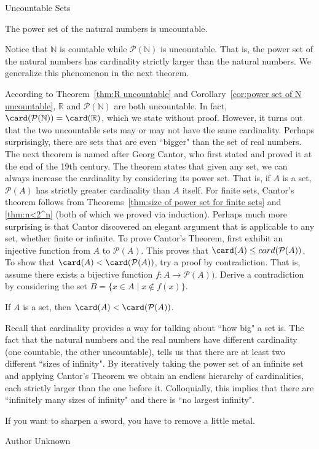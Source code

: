 \begin{section}{Uncountable Sets}
\begin{corollary}\label{cor:power set of N uncountable}
The power set of the natural numbers is uncountable.
\end{corollary}

Notice that $\mathbb{N}$ is countable while $\mathcal{P}(\mathbb{N})$ is uncountable.  That is, the power set of the natural numbers has cardinality strictly larger than the natural numbers. We generalize this phenomenon in the next theorem.

According to Theorem~\ref{thm:R uncountable} and Corollary~\ref{cor:power set of N uncountable}, $\mathbb{R}$ and $\mathcal{P}(\mathbb{N})$ are both uncountable. In fact, $\card(\mathcal{P}(\mathbb{N}))=\card(\mathbb{R})$, which we state without proof.  However, it turns out that the two uncountable sets may or may not have the same cardinality.  Perhaps surprisingly, there are sets that are even ``bigger" than the set of real numbers. The next theorem is named after Georg Cantor, who first stated and proved it at the end of the 19th century. The theorem states that given any set, we can always increase the cardinality by considering its power set. That is, if $A$ is a set, $\mathcal{P}(A)$ has strictly greater cardinality than $A$ itself. For finite sets, Cantor's theorem follows from Theorems~\ref{thm:size of power set for finite sets} and \ref{thm:n<2^n} (both of which we proved via induction). Perhaps much more surprising is that Cantor discovered an elegant argument that is applicable to any set, whether finite or infinite. To prove Cantor's Theorem, first exhibit an injective function from $A$ to $\mathcal{P}(A)$. This proves that $\card(A)\leq card(\mathcal{P}(A))$. To show that $\card(A)< \card(\mathcal{P}(A))$, try a proof by contradiction. That is, assume there exists a bijective function $f:A\to\mathcal{P}(A))$. Derive a contradiction by considering the set $B=\{x\in A\mid x\notin f(x)\}$.

\begin{theorem}\label{thm:Cantors Theorem}
If $A$ is a set, then $\card(A)<\card(\mathcal{P}(A))$.
\end{theorem}

Recall that cardinality provides a way for talking about ``how big" a set is. The fact that the natural numbers and the real numbers have different cardinality (one countable, the other uncountable), tells us that there are at least two different ``sizes of infinity".  By iteratively taking the power set of an infinite set and applying Cantor's Theorem we obtain an endless hierarchy of cardinalities, each strictly larger than the one before it. Colloquially, this implies that there are ``infinitely many sizes of infinity" and there is ``no largest infinity".

\epigraph{If you want to sharpen a sword, you have to remove a little metal.}{Author Unknown}

\end{section}